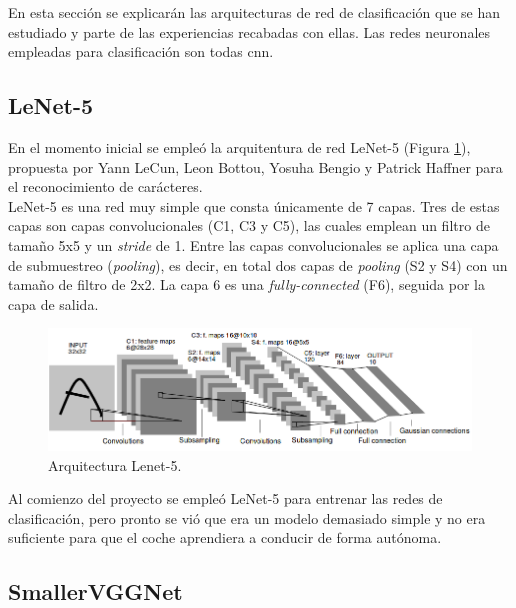 En esta sección se explicarán las arquitecturas de red de clasificación que se han estudiado y parte de las experiencias recabadas con ellas. Las redes neuronales empleadas para clasificación son todas \acrshort{cnn}.

\subsection{LeNet-5}

En el momento inicial se empleó la arquitentura de red LeNet-5 \cite{LeCunGradient} (Figura \ref{fig.Lenet}), propuesta por Yann LeCun, Leon Bottou, Yosuha Bengio y Patrick Haffner para el reconocimiento de carácteres.\\

LeNet-5 es una red muy simple que consta únicamente de 7 capas. Tres de estas capas son capas convolucionales (C1, C3 y C5), las cuales emplean un filtro de tamaño 5x5 y un \textit{stride} de 1. Entre las capas convolucionales se aplica una capa de submuestreo (\textit{pooling}), es decir, en total dos capas de \textit{pooling} (S2 y S4) con un tamaño de filtro de 2x2. La capa 6 es una \textit{fully-connected} (F6), seguida por la capa de salida.\\

\begin{figure}
\begin{center}
	\includegraphics[width=1\textwidth]{figures/Clasificacion/model_lenet.png}
   \caption{Arquitectura Lenet-5.}
	\label{fig.Lenet}
\end{center}
\end{figure}

Al comienzo del proyecto se empleó LeNet-5 para entrenar las redes de clasificación, pero pronto se vió que era un modelo demasiado simple y no era suficiente para que el coche aprendiera a conducir de forma autónoma. 


\subsection{SmallerVGGNet}

